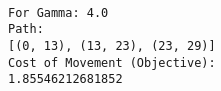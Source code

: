 \documentclass[11pt]{article}
\begin{document}
    \begin{Verbatim}[commandchars=\\\{\}]

For Gamma: 4.0
Path:
[(0, 13), (13, 23), (23, 29)]
Cost of Movement (Objective):
1.85546212681852

    \end{Verbatim}

    \begin{center}
    \end{center}
    { \hspace*{\fill} \\}
    
    \begin{center}
    \end{center}
    { \hspace*{\fill} \\}
    

    
    
    
    
\end{document}

